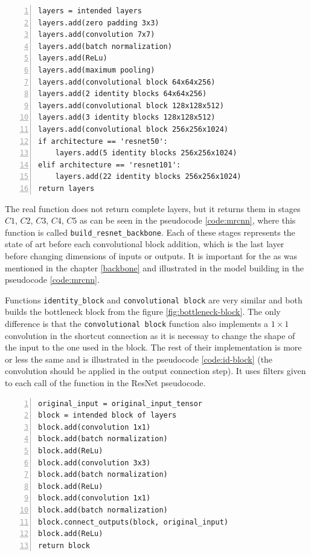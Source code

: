 {\scriptsize
\begin{lstlisting}[style=python, caption={Building the ResNet backbone architecture}, captionpos=b, label=code:resnet, deletekeywords={from, max},
backgroundcolor = \color{light-gray}, numbers=left, breaklines=true]
layers = intended layers
layers.add(zero padding 3x3)
layers.add(convolution 7x7)
layers.add(batch normalization)
layers.add(ReLu)
layers.add(maximum pooling)
layers.add(convolutional block 64x64x256)
layers.add(2 identity blocks 64x64x256)
layers.add(convolutional block 128x128x512)
layers.add(3 identity blocks 128x128x512)
layers.add(convolutional block 256x256x1024)
if architecture == 'resnet50':
    layers.add(5 identity blocks 256x256x1024)
elif architecture == 'resnet101':
    layers.add(22 identity blocks 256x256x1024)
return layers
\end{lstlisting}}

The real function does not return complete layers, but it returns them in stages $C1$, $C2$, $C3$, $C4$, $C5$ as can be seen in the pseudocode \ref{code:mrcnn}, where this function is called \verb|build_resnet_backbone|. Each of these stages represents the state of art before each convolutional block addition, which is the last layer before changing dimensions of inputs or outputs. It is important for the  as was mentioned in the chapter \ref{backbone} and illustrated in the model building in the pseudocode \ref{code:mrcnn}.

Functions \verb|identity_block| and \verb|convolutional block| are very similar and both builds the bottleneck block from the figure \ref{fig:bottleneck-block}. The only difference is that the \verb|convolutional block| function also implements a $1 \times 1$ convolution in the shortcut connection as it is necessay to change the shape of the input to the one used in the block. The rest of their implementation is more or less the same and is illustrated in the pseudocode \ref{code:id-block} (the convolution should be applied in the output connection step). It uses filters given to each call of the function in the ResNet pseudocode.

{\scriptsize
\begin{lstlisting}[style=python, caption={identity\_block}, captionpos=b, label=code:id-block, deletekeywords={from, input},
backgroundcolor = \color{light-gray}, numbers=left, breaklines=true]
original_input = original_input_tensor
block = intended block of layers
block.add(convolution 1x1)
block.add(batch normalization)
block.add(ReLu)
block.add(convolution 3x3)
block.add(batch normalization)
block.add(ReLu)
block.add(convolution 1x1)
block.add(batch normalization)
block.connect_outputs(block, original_input)
block.add(ReLu)
return block
\end{lstlisting}}

